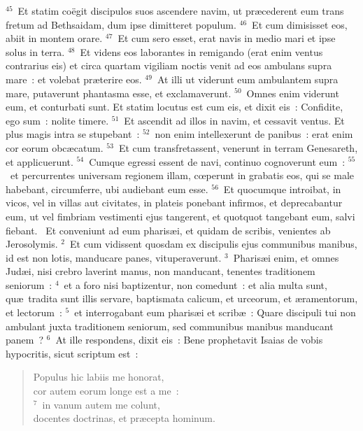 ${}^{45}$~Et statim co\"egit discipulos suos ascendere navim, ut pr\ae cederent eum trans fretum ad Bethsaidam, dum ipse dimitteret populum.
${}^{46}$~Et cum dimisisset eos, abiit in montem orare.
${}^{47}$~Et cum sero esset, erat navis in medio mari et ipse solus in terra.
${}^{48}$~Et videns eos laborantes in remigando (erat enim ventus contrarius eis) et circa quartam vigiliam noctis venit ad eos ambulans supra mare~: et volebat pr\ae terire eos.
${}^{49}$~At illi ut viderunt eum ambulantem supra mare, putaverunt phantasma esse, et exclamaverunt.
${}^{50}$~Omnes enim viderunt eum, et conturbati sunt. Et statim locutus est cum eis, et dixit eis~: Confidite, ego sum~: nolite timere.
${}^{51}$~Et ascendit ad illos in navim, et cessavit ventus. Et plus magis intra se stupebant~:
${}^{52}$~non enim intellexerunt de panibus~: erat enim cor eorum obc\ae catum.
${}^{53}$~Et cum transfretassent, venerunt in terram Genesareth, et applicuerunt.
${}^{54}$~Cumque egressi essent de navi, continuo cognoverunt eum~:
${}^{55}$~et percurrentes universam regionem illam, cœperunt in grabatis eos, qui se male habebant, circumferre, ubi audiebant eum esse.
${}^{56}$~Et quocumque introibat, in vicos, vel in villas aut civitates, in plateis ponebant infirmos, et deprecabantur eum, ut vel fimbriam vestimenti ejus tangerent, et quotquot tangebant eum, salvi fiebant.
~Et conveniunt ad eum pharis\ae i, et quidam de scribis, venientes ab Jerosolymis.
${}^{2}$~Et cum vidissent quosdam ex discipulis ejus communibus manibus, id est non lotis, manducare panes, vituperaverunt.
${}^{3}$~Pharis\ae i enim, et omnes Jud\ae i, nisi crebro laverint manus, non manducant, tenentes traditionem seniorum~:
${}^{4}$~et a foro nisi baptizentur, non comedunt~: et alia multa sunt, qu\ae\ tradita sunt illis servare, baptismata calicum, et urceorum, et \ae ramentorum, et lectorum~:
${}^{5}$~et interrogabant eum pharis\ae i et scrib\ae~: Quare discipuli tui non ambulant juxta traditionem seniorum, sed communibus manibus manducant panem~?
${}^{6}$~At ille respondens, dixit eis~: Bene prophetavit Isaias de vobis hypocritis, sicut scriptum est~: \begin{flushleft}\begin{verse}Populus hic labiis me honorat,\\ cor autem eorum longe est a me~:\\
${}^{7}$~in vanum autem me colunt,\\ docentes doctrinas, et pr\ae cepta hominum.\end{verse}\end{flushleft}


